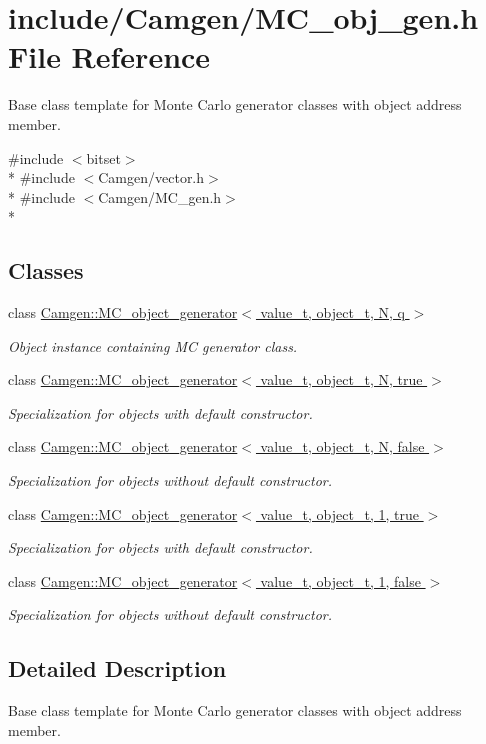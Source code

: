 \hypertarget{a00673}{\section{include/\-Camgen/\-M\-C\-\_\-obj\-\_\-gen.h File Reference}
\label{a00673}
}


Base class template for Monte Carlo generator classes with object address member.  


{\ttfamily \#include $<$bitset$>$}\\*
{\ttfamily \#include $<$Camgen/vector.\-h$>$}\\*
{\ttfamily \#include $<$Camgen/\-M\-C\-\_\-gen.\-h$>$}\\*
\subsection*{Classes}
\begin{DoxyCompactItemize}
\item 
class \hyperlink{a00364}{Camgen\-::\-M\-C\-\_\-object\-\_\-generator$<$ value\-\_\-t, object\-\_\-t, N, q $>$}
\begin{DoxyCompactList}\small\item\em Object instance containing M\-C generator class. \end{DoxyCompactList}\item 
class \hyperlink{a00368}{Camgen\-::\-M\-C\-\_\-object\-\_\-generator$<$ value\-\_\-t, object\-\_\-t, N, true $>$}
\begin{DoxyCompactList}\small\item\em Specialization for objects with default constructor. \end{DoxyCompactList}\item 
class \hyperlink{a00367}{Camgen\-::\-M\-C\-\_\-object\-\_\-generator$<$ value\-\_\-t, object\-\_\-t, N, false $>$}
\begin{DoxyCompactList}\small\item\em Specialization for objects without default constructor. \end{DoxyCompactList}\item 
class \hyperlink{a00366}{Camgen\-::\-M\-C\-\_\-object\-\_\-generator$<$ value\-\_\-t, object\-\_\-t, 1, true $>$}
\begin{DoxyCompactList}\small\item\em Specialization for objects with default constructor. \end{DoxyCompactList}\item 
class \hyperlink{a00365}{Camgen\-::\-M\-C\-\_\-object\-\_\-generator$<$ value\-\_\-t, object\-\_\-t, 1, false $>$}
\begin{DoxyCompactList}\small\item\em Specialization for objects without default constructor. \end{DoxyCompactList}\end{DoxyCompactItemize}


\subsection{Detailed Description}
Base class template for Monte Carlo generator classes with object address member. 